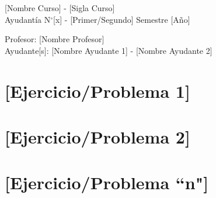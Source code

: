\documentclass[letterpaper,11pt,oneside]{article}
\newcommand{\grad}{$^{\circ}$}
\begin{document}
	\begin{center}
		{\Large [Nombre Curso] - [Sigla Curso]}\\
		{\large Ayudantía N\grad [x] - [Primer/Segundo] Semestre [Año]}
	\end{center}

	\begin{center}
		Profesor: [Nombre Profesor]\\
		Ayudante[s]: [Nombre Ayudante 1] - [Nombre Ayudante 2]
	\end{center}

\section*{[Ejercicio/Problema 1]}

\section*{[Ejercicio/Problema 2]}

\section*{[Ejercicio/Problema ``n"]}
\end{document}
